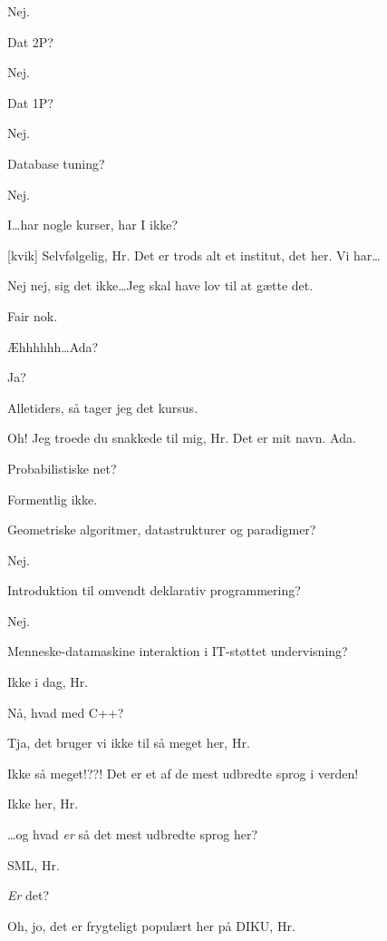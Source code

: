\documentclass[a4paper,11pt]{article}
\begin{document}
\begin{sketch}
   Nej.

   Dat 2P?

   Nej.

   Dat 1P?

   Nej.

   Database tuning?

   Nej.

   I\ldots har nogle kurser, har I ikke?

  [kvik] Selvfølgelig, Hr. Det er trods alt et institut, det her. Vi
  har\ldots

   Nej nej, sig det ikke\ldots Jeg skal have lov til at gætte det.

   Fair nok.

   Æhhhhhh\ldots Ada?

   Ja?

   Alletiders, så tager jeg det kursus.

   Oh! Jeg troede du snakkede til mig, Hr. Det er mit navn. Ada.


   Probabilistiske net?

   Formentlig ikke.

   Geometriske algoritmer, datastrukturer og paradigmer?

   Nej.

   Introduktion til omvendt deklarativ programmering?

   Nej.

   Menneske-datamaskine interaktion i IT-støttet undervisning?

   Ikke i dag, Hr.


   Nå, hvad med C++?

   Tja, det bruger vi ikke til så meget her, Hr.

   Ikke så meget!??! Det er et af de mest udbredte sprog i verden!

   Ikke her, Hr.

    \ldots og hvad \emph{er} så det mest udbredte sprog
  her?

   SML, Hr.

   \emph{Er} det?

   Oh, jo, det er frygteligt populært her på DIKU, Hr.


\end{sketch}
\end{document}
